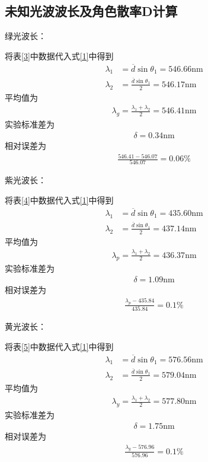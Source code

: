 \documentclass[dvipsnames, svgnames,a4paper,11pt]{article}
\begin{document}
\subsection{未知光波波长及角色散率D计算}
\noindent 绿光波长：

将表\ref{3}中数据代入式\ref{1}中得到
 \begin{align*}
	\lambda_1&=\overline{d}\sin\theta_1=546.66\text{nm}\\
	\lambda_2&=\frac{\overline{d}\sin\theta_1}{2}=546.17\text{nm}
 \end{align*}
 平均值为
 \begin{align*}
	\lambda_g=\frac{\lambda_1+\lambda_2}{2}=546.41\text{nm}
 \end{align*}
 实验标准差为
 \begin{align*}
	\delta=0.34\text{nm}
 \end{align*}
 相对误差为
 \begin{align*}
	\frac{546.41-546.07}{546.07}=0.06\%
 \end{align*}

 \noindent 紫光波长：

将表\ref{4}中数据代入式\ref{1}中得到
 \begin{align*}
	\lambda_1&=\overline{d}\sin\theta_1=435.60\text{nm}\\
	\lambda_2&=\frac{\overline{d}\sin\theta_1}{2}=437.14\text{nm}
 \end{align*}
 平均值为
 \begin{align*}
	\lambda_p=\frac{\lambda_1+\lambda_2}{2}=436.37\text{nm}
 \end{align*}
 实验标准差为
 \begin{align*}
	\delta=1.09\text{nm}
 \end{align*}
 相对误差为
 \begin{align*}
	\frac{\lambda_p-435.84}{435.84}=0.1\%
 \end{align*}

 \noindent 黄光波长：

将表\ref{5}中数据代入式\ref{1}中得到
 \begin{align*}
	\lambda_1&=\overline{d}\sin\theta_1=576.56\text{nm}\\
	\lambda_2&=\frac{\overline{d}\sin\theta_1}{2}=579.04\text{nm}
 \end{align*}
 平均值为
 \begin{align*}
	\lambda_y=\frac{\lambda_1+\lambda_2}{2}=577.80\text{nm}
 \end{align*}
 实验标准差为
 \begin{align*}
	\delta=1.75\text{nm}
 \end{align*}
 相对误差为
 \begin{align*}
	\frac{\lambda_y-576.96}{576.96}=0.1\%
 \end{align*}
\end{document}
